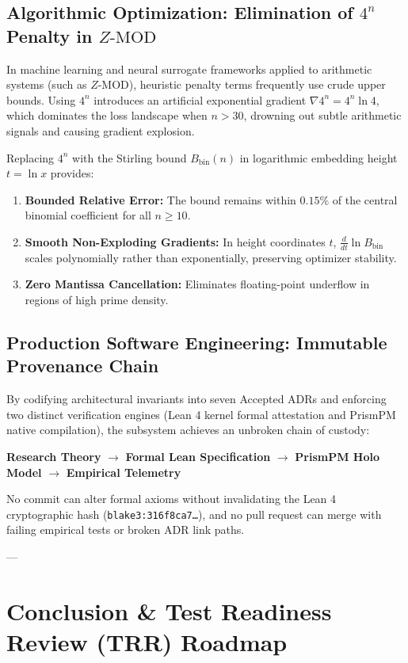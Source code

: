 \documentclass[11pt,a4paper]{article}
\theoremstyle{definition}
\theoremstyle{remark}
\begin{document}
\subsection{Algorithmic Optimization: Elimination of \texorpdfstring{$4^n$}{4\string^n} Penalty in \texorpdfstring{$Z\text{-MOD}$}{Z-MOD}}
In machine learning and neural surrogate frameworks applied to arithmetic systems (such as $Z\text{-MOD}$), heuristic penalty terms frequently use crude upper bounds. Using $4^n$ introduces an artificial exponential gradient $\nabla 4^n = 4^n \ln 4$, which dominates the loss landscape when $n > 30$, drowning out subtle arithmetic signals and causing gradient explosion.

Replacing $4^n$ with the Stirling bound $B_{\mathrm{bin}}(n)$ in logarithmic embedding height $t = \ln x$ provides:
\begin{enumerate}
    \item \textbf{Bounded Relative Error:} The bound remains within $0.15\%$ of the central binomial coefficient for all $n \ge 10$.
    \item \textbf{Smooth Non-Exploding Gradients:} In height coordinates $t$, $\frac{d}{dt} \ln B_{\mathrm{bin}}$ scales polynomially rather than exponentially, preserving optimizer stability.
    \item \textbf{Zero Mantissa Cancellation:} Eliminates floating-point underflow in regions of high prime density.
\end{enumerate}

\subsection{Production Software Engineering: Immutable Provenance Chain}
By codifying architectural invariants into seven Accepted ADRs and enforcing two distinct verification engines (Lean 4 kernel formal attestation and PrismPM native compilation), the subsystem achieves an unbroken chain of custody:
\begin{center}
\textbf{Research Theory} $\longrightarrow$ \textbf{Formal Lean Specification} $\longrightarrow$ \textbf{PrismPM Holo Model} $\longrightarrow$ \textbf{Empirical Telemetry}
\end{center}
No commit can alter formal axioms without invalidating the Lean 4 cryptographic hash (\texttt{blake3:316f8ca7\dots}), and no pull request can merge with failing empirical tests or broken ADR link paths.

---

\section{Conclusion \& Test Readiness Review (TRR) Roadmap}
\end{document}
